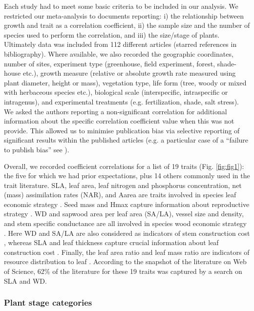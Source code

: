 \documentclass[a4paper,11pt]{article}
\begin{document}
Each study had to meet some basic criteria to be included in our analysis. We restricted our meta-analysis to documents reporting: i) the relationship between growth and trait as a correlation coefficient, ii) the sample size and the number of species used to perform the correlation, and iii) the size/stage of plants. Ultimately data was included from 112 different articles (starred references in bibliography). Where available, we also recorded the geographic coordinates, number of sites, experiment type (greenhouse, field experiment, forest, shade-house etc.), growth measure (relative or absolute growth rate measured using plant diameter, height or mass), vegetation type, life form (tree, woody or mixed with herbaceous species etc.), biological scale (interspecific, intraspecific or intragenus), and experimental treatments (e.g. fertilization, shade, salt stress).  We asked the authors reporting a non-significant correlation for additional information about the specific correlation coefficient value when this was not provide. This allowed us to minimise publication bias via selective reporting of significant results within the published articles (e.g. a particular case of a ``failure to publish bias'' see \citealt{Jennions:2013ta}).

Overall, we recorded coefficient correlations for a list of 19 traits (Fig. \ref{fig:fig1}): the five for which we had prior expectations, plus 14 others commonly used in the trait literature. SLA, leaf area, leaf nitrogen and phosphorus concentration, net (mass) assimilation rates (NAR), and Aarea are traits involved in species leaf economic strategy \citep{Wright:2004jb,Wright:2010tp}. Seed mass and Hmax capture information about reproductive strategy \citep{Falster:2005bw,Moles:2006ft}. WD and sapwood area per leaf area (SA/LA), vessel size and density, and stem specific conductance are all involved in species wood economic strategy  \citep{Chave:2009iy}. Here WD and SA/LA are also considered as indicators of stem construction cost \citep{Falster:2011ii}, whereas SLA and leaf thickness capture crucial information about leaf construction cost \citep{Wright:2004jb}. Finally, the leaf area ratio and leaf mass ratio are indicators of resource distribution to leaf \citep{Lambers:1992bj}. According to the snapshot of the literature on Web of Science, 62\% of the literature for these 19 traits was captured by a search on SLA and WD.

\subsubsection*{Plant stage categories}\label{plant-stage-categories}
\end{document}
